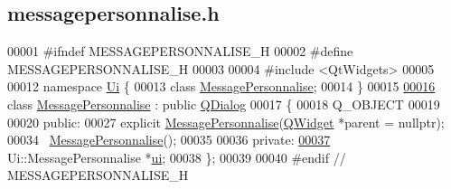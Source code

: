 \hypertarget{messagepersonnalise_8h_source}{}\subsection{messagepersonnalise.\+h}

\begin{DoxyCode}
00001 \textcolor{preprocessor}{#ifndef MESSAGEPERSONNALISE\_H}
00002 \textcolor{preprocessor}{#define MESSAGEPERSONNALISE\_H}
00003 
00004 \textcolor{preprocessor}{#include <QtWidgets>}
00005 
00012 \textcolor{keyword}{namespace }\hyperlink{namespace_ui}{Ui} \{
00013 \textcolor{keyword}{class }\hyperlink{class_message_personnalise}{MessagePersonnalise};
00014 \}
00015 
\hyperlink{class_message_personnalise}{00016} \textcolor{keyword}{class }\hyperlink{class_message_personnalise}{MessagePersonnalise} : \textcolor{keyword}{public} \hyperlink{class_q_dialog}{QDialog}
00017 \{
00018     Q\_OBJECT
00019 
00020 \textcolor{keyword}{public}:
00027     \textcolor{keyword}{explicit} \hyperlink{class_message_personnalise}{MessagePersonnalise}(\hyperlink{class_q_widget}{QWidget} *parent = \textcolor{keyword}{nullptr});
00034     ~\hyperlink{class_message_personnalise}{MessagePersonnalise}();
00035 
00036 \textcolor{keyword}{private}:
\hyperlink{class_message_personnalise_a94bdf252f3e858ec1c2ed354d31a91e3}{00037}     Ui::MessagePersonnalise *\hyperlink{class_message_personnalise_a94bdf252f3e858ec1c2ed354d31a91e3}{ui};            
00038 \};
00039 
00040 \textcolor{preprocessor}{#endif // MESSAGEPERSONNALISE\_H}
\end{DoxyCode}

